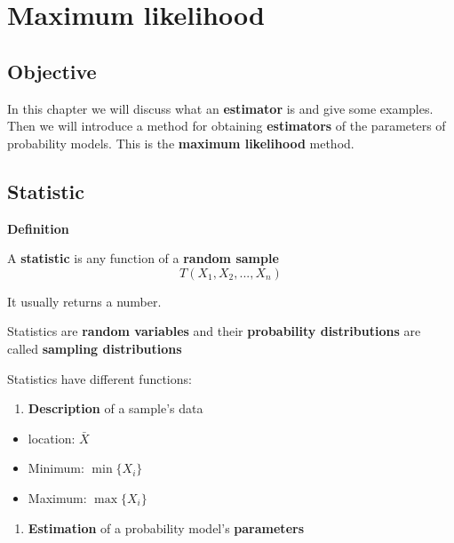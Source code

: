 \documentclass[
]{book}
\providecommand{\tightlist}{%
  \setlength{\itemsep}{0pt}\setlength{\parskip}{0pt}}
\begin{document}
\hypertarget{maximum-likelihood}{%
\chapter{Maximum likelihood}\label{maximum-likelihood}}

\hypertarget{objective-7}{%
\section{Objective}\label{objective-7}}

In this chapter we will discuss what an \textbf{estimator} is and give some examples. Then we will introduce a method for obtaining \textbf{estimators} of the parameters of probability models. This is the \textbf{maximum likelihood} method.

\hypertarget{statistic}{%
\section{Statistic}\label{statistic}}

\textbf{Definition}

A \textbf{statistic} is any function of a \textbf{random sample}
\[T(X_1,X_2, ..., X_n)\]

It usually returns a number.

Statistics are \textbf{random variables} and their \textbf{probability distributions} are called \textbf{sampling distributions}

Statistics have different functions:

\begin{enumerate}
\def\labelenumi{\arabic{enumi}.}
\tightlist
\item
  \textbf{Description} of a sample's data
\end{enumerate}

\begin{itemize}
\tightlist
\item
  location: \(\bar{X}\)
\item
  Minimum: \(\min\{X_i\}\)
\item
  Maximum: \(\max\{X_i\}\)
\end{itemize}

\begin{enumerate}
\def\labelenumi{\arabic{enumi}.}
\setcounter{enumi}{1}
\tightlist
\item
  \textbf{Estimation} of a probability model's \textbf{parameters}
\end{enumerate}
\end{document}
